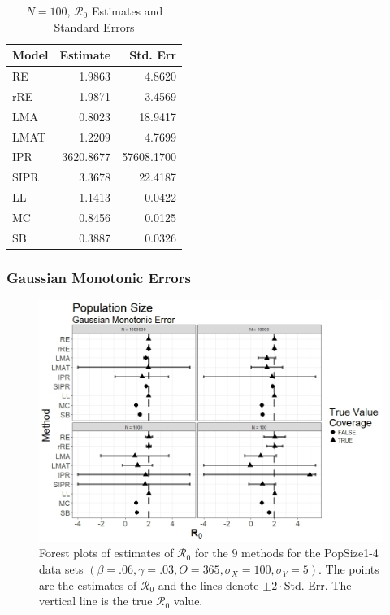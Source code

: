 \documentclass[12pt]{article}
\newcommand{\xxsir}{\ensuremath{9} } %
\newcommand{\rr}{\ensuremath{\mathcal{R}_0}}
\begin{document}
\begin{table}[H]
	
	\centering
	\begin{tabular}[t]{l|r|r}
		\hline
		Model & Estimate & Std. Err\\
		\hline
		RE & 1.9863 & 4.8620\\
		\hline
		rRE & 1.9871 & 3.4569\\
		\hline
		LMA & 0.8023 & 18.9417\\
		\hline
		LMAT & 1.2209 & 4.7699\\
		\hline
		IPR & 3620.8677 & 57608.1700\\
		\hline
		SIPR & 3.3678 & 22.4187\\
		\hline
		LL & 1.1413 & 0.0422\\
		\hline
		MC & 0.8456 & 0.0125\\
		\hline
		SB & 0.3887 & 0.0326\\
		\hline
	\end{tabular}
\caption{$N = 100$, $\rr$ Estimates and Standard Errors}\label{tab:n2-res2}
\end{table}

\subsubsection{Gaussian Monotonic Errors}

\begin{figure}[H]
	\centering
	\includegraphics[scale=0.5]{images/popsize_nm.jpeg}
	\caption{Forest plots of estimates of $\rr$ for the \xxsir methods for the PopSize1-4 data sets $(\beta=.06, \gamma=.03, O=365, \sigma_X=100, \sigma_Y=5)$.  The points are the estimates of $\rr$ and the lines denote $\pm 2\cdot $Std. Err.  The vertical line is the true $\rr$ value.}
\end{figure}
\end{document}
